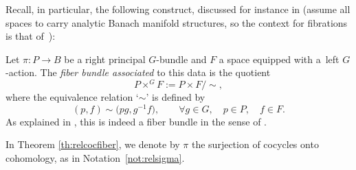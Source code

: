 \documentclass[pdftex]{sigma}
\numberwithin{equation}{section}
\begin{document}
Recall, in particular, the following construct, discussed for instance in \cite[Section~6.5]{bourb-vars-17} (assume all spaces to carry analytic Banach manifold structures, so the context for fibrations is that of~\cite[Section~6.1.1]{bourb-vars-17}):

\begin{Definition}\label{def:assocbdle}
 Let $\pi\colon P\to B$ be a right principal $G$-bundle and $F$ a space equipped with a~left $G$-action. The {\it fiber bundle associated} to this data is the quotient
 \begin{equation*}
 P\times^G F:=P\times F/{\sim},
 \end{equation*}
 where the equivalence relation `$\sim$' is defined by
 \begin{equation*}
 (p,f)\sim \big(pg,g^{-1}f\big),\qquad \forall g\in G,\quad p\in P,\quad f\in F.
 \end{equation*}
 As explained in \cite[Section~6.5.2]{bourb-vars-17}, this is indeed a fiber bundle in the sense of \cite[Section~6.1.1]{bourb-vars-17}.
\end{Definition}

In Theorem \ref{th:relcocfiber}, we denote by $\pi$ the surjection of cocycles onto cohomology, as in Notation~\ref{not:relsigma}.
\end{document}
